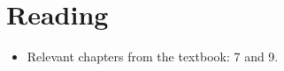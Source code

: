 \documentclass[notes=show]{beamer}
\begin{document}
\section{Reading}

\begin{frame}%


\begin{itemize}
\item Relevant chapters from the textbook: 7 and 9.
\end{itemize}

\end{frame}%
\end{document}
